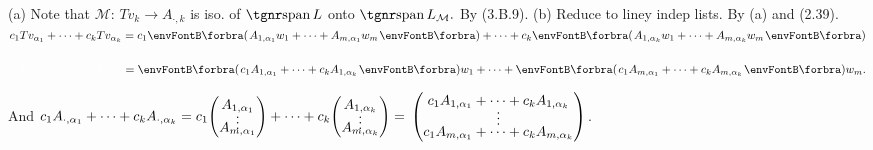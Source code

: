 (a) Note that $\mathcal{M}\!:\,Tv_k\rightarrow A_{\cdot,k}$ is iso. of $\Spn L$ onto $\Spn L_{\mathcal{M}}.$ By (3.B.9).\parSol{}
(b) Reduce to liney indep lists. By (a) and (2.39).\PfEnd\vspace{4pt}\quad
\Or\;$c_1Tv_{\alpha_1}+\dots+c_kTv_{\alpha_k}=c_1\BigPar{A_{1,{\alpha_1}}w_1+\dots+A_{m,{\alpha_1}}w_m}+\dots+c_k\BigPar{A_{1,{\alpha_k}}w_1+\dots+A_{m,{\alpha_k}}w_m}$\par\vspace{2pt}\quad
\Blind{\Or\;}$\Blind{c_1Tv_{\alpha_1}+\dots+c_kTv_{\alpha_k}}=\BigPar{c_1A_{1,{\alpha_1}}+\dots+c_kA_{1,{\alpha_k}}}w_1+\dots+\BigPar{c_1A_{m,{\alpha_1}}+\dots+c_kA_{m,{\alpha_k}}}w_m.$\par\vspace{4pt}\quad
\Blind{\Or\;}And \;$c_1A_{\cdot,{\alpha_1}}+\dots+c_kA_{\cdot,{\alpha_k}}=c_1{\normalsize\begin{pmatrix}A_{1,{\alpha_1}}\\[-4pt]\vdots\\[-10pt]A_{m,{\alpha_1}}\end{pmatrix}}+\dots+c_k{\normalsize\begin{pmatrix}A_{1,{\alpha_k}}\\[-4pt]\vdots\\[-10pt]A_{m,{\alpha_k}}\end{pmatrix}}{}={}\normalsize\begin{pmatrix}c_1 A_{1,{\alpha_1}}+\dots+c_kA_{1,{\alpha_k}}\\[-4pt]\vdots\\[-4pt]c_1A_{m,{\alpha_1}}+\dots+c_kA_{m,{\alpha_k}}\end{pmatrix}$.\par\vspace{6pt}\quad
